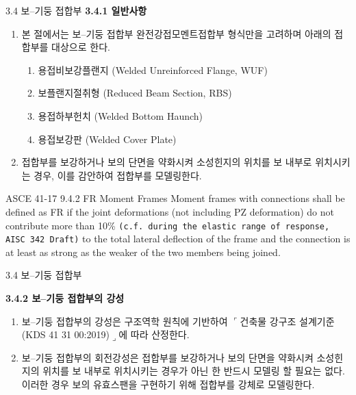 \begin{frame}{3.4 보--기둥 접합부}
\textbf{3.4.1 일반사항}
\begin{enumerate}
	\item[(1)] 본 절에서는 보--기둥 접합부 완전강접모멘트접합부 형식만을 고려하며 아래의 접합부를 대상으로 한다. 
	\begin{enumerate}[label=\large\protect\textcircled{\small\arabic*}]
		\item 용접비보강플랜지 (Welded Unreinforced Flange, WUF)
		\item 보플랜지절취형 (Reduced Beam Section, RBS)
		\item 용접하부헌치 (Welded Bottom Haunch)
		\item 용접보강판 (Welded Cover Plate)
	\end{enumerate}	
	\item[(2)] 접합부를 보강하거나 보의 단면을 약화시켜 소성힌지의 위치를 보 내부로 위치시키는 경우, 이를 감안하여 접합부를 모델링한다. 
\end{enumerate}

\begin{block}{ASCE 41-17 9.4.2 FR Moment Frames}
	Moment frames with connections shall be defined as FR if the joint deformations (not including PZ deformation) do not contribute more than 10\% \texttt{(c.f. during the elastic range of response, AISC 342 Draft)} to the total lateral deflection of the frame and the connection is at least as strong as the weaker of the two members being joined. 
\end{block}
\end{frame}


\begin{frame}{3.4 보--기둥 접합부}

	\textbf{3.4.2 보--기둥 접합부의 강성}

\begin{enumerate}
	\item[(1)] 보--기둥 접합부의 강성은 구조역학 원칙에 기반하여 $\ulcorner$건축물 강구조 설계기준 (KDS 41 31 00:2019)$\lrcorner$에 따라 산정한다. 
	\item[(2)] 보--기둥 접합부의 회전강성은 접합부를 보강하거나 보의 단면을 약화시켜 소성힌지의 위치를 보 내부로 위치시키는 경우가 아닌 한 반드시 모델링 할 필요는 없다. 이러한 경우 보의 유효스팬을 구현하기 위해 접합부를 강체로 모델링한다. 
\end{enumerate}

\end{frame}

